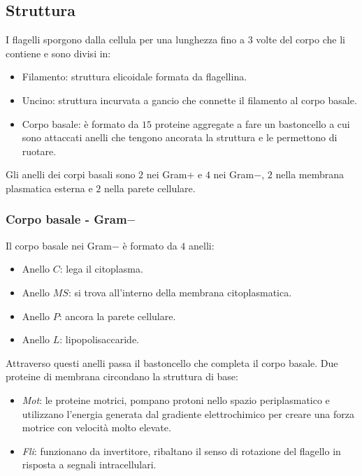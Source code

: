 	\subsection{Struttura}
	I flagelli sporgono dalla cellula per una lunghezza fino a $3$ volte del corpo che li contiene e sono divisi in:
	\begin{itemize}
		\item Filamento: struttura elicoidale formata da flagellina.
		\item Uncino: struttura incurvata a gancio che connette il filamento al corpo basale.
		\item Corpo basale: \`e formato da $15$ proteine aggregate a fare un bastoncello a cui sono attaccati anelli che tengono ancorata la struttura e le permettono di ruotare.
	\end{itemize}
	Gli anelli dei corpi basali sono $2$ nei Gram$+$ e $4$ nei Gram$-$, $2$ nella membrana plasmatica esterna e $2$ nella parete cellulare.

		\subsubsection{Corpo basale - Gram$\mathbf{-}$}
		Il corpo basale nei Gram$-$ \`e formato da $4$ anelli:
		\begin{multicols}{2}
			\begin{itemize}
				\item Anello $C$: lega il citoplasma.
				\item Anello $MS$: si trova all'interno della membrana citoplasmatica.
				\item Anello $P$: ancora la parete cellulare.
				\item Anello $L$: lipopolisaccaride.
			\end{itemize}
		\end{multicols}
		Attraverso questi anelli passa il bastoncello che completa il corpo basale.
		Due proteine di membrana circondano la struttura di base:
		\begin{multicols}{2}
			\begin{itemize}
				\item \emph{Mot}: le proteine motrici, pompano protoni nello spazio periplasmatico e utilizzano l'energia generata dal gradiente elettrochimico per creare una forza motrice con velocit\`a molto elevate.
				\item \emph{Fli}: funzionano da invertitore, ribaltano il senso di rotazione del flagello in risposta a segnali intracellulari.
			\end{itemize}
		\end{multicols}

